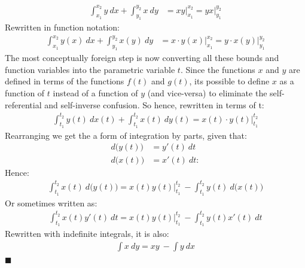 \documentclass[11pt,a4paper]{article}
\newcommand{\qed}{\hfill $\blacksquare$}
\begin{document}
\begin{align*}
\int_{x_1}^{x_2} y \ dx + \int_{y_1}^{y_2} x \ dy &= xy \Big|_{x_1}^{x_2} = yx \Big|_{y_1}^{y_2} 
\end{align*}
Rewritten in function notation:
\begin{align*}
\int_{x_1}^{x_2} y(x) \ dx + \int_{y_1}^{y_2} x(y) \ dy &= x \cdot y(x) \Big|_{x_1}^{x_2} = y\cdot x(y) \Big|_{y_1}^{y_2}
\end{align*}
The most conceptually foreign step is now converting all these bounds and function variables into the parametric variable $t$.  Since the functions $x$ and $y$ are defined in terms of the functions $f(t)$ and $g(t)$,  its possible to define $x$ as a function of $t$ instead of a function of $y$ (and vice-versa) to eliminate the self-referential and self-inverse confusion.  So hence, rewritten in terms of t:
\begin{align*}
\int_{t_1}^{t_2} y(t) \ dx(t) + \int_{t_1}^{t_2} x(t) \ dy(t) = x(t)\cdot y(t) \Big|_{t_1}^{t_2} 
\end{align*}
Rearranging we get the a form of integration by parts, given that: \begin{align*}
d\big( y(t) \big) &= y'(t)\ dt \\
d\big(x(t)\big) &= x'(t)\ dt:
\end{align*}
Hence:
\begin{align*}
\int_{t_1}^{t_2} x(t) \ d\big(y(t)\big) = x(t)y(t) \Big|_{t_1}^{t_2} \ - \int_{t_1}^{t_2} y(t) \ d\big(x(t)\big)
\end{align*}
Or sometimes written as:
\begin{align*}
\int_{t_1}^{t_2} x(t)y'(t) \ dt = x(t)y(t) \Big|_{t_1}^{t_2} \ - \int_{t_1}^{t_2} y(t)x'(t)\ dt
\end{align*}
Rewritten with indefinite integrals, it is also:
\begin{align*}
\int x\ dy = xy \ - \int y \ dx 
\end{align*}
\qed
\end{document}
